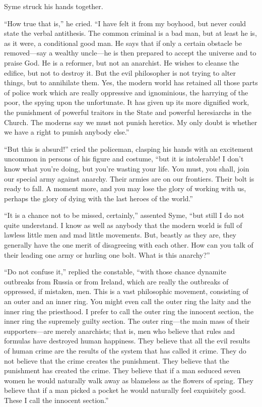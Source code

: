 Syme struck his hands together.

“How true that is,” he cried. “I have felt it from my boyhood, but never could state the verbal antithesis. The common criminal is a bad man, but at least he is, as it were, a conditional good man. He says that if only a certain obstacle be removed⁠—say a wealthy uncle⁠—he is then prepared to accept the universe and to praise God. He is a reformer, but not an anarchist. He wishes to cleanse the edifice, but not to destroy it. But the evil philosopher is not trying to alter things, but to annihilate them. Yes, the modern world has retained all those parts of police work which are really oppressive and ignominious, the harrying of the poor, the spying upon the unfortunate. It has given up its more dignified work, the punishment of powerful traitors in the State and powerful heresiarchs in the Church. The moderns say we must not punish heretics. My only doubt is whether we have a right to punish anybody else.”

“But this is absurd!” cried the policeman, clasping his hands with an excitement uncommon in persons of his figure and costume, “but it is intolerable! I don’t know what you’re doing, but you’re wasting your life. You must, you shall, join our special army against anarchy. Their armies are on our frontiers. Their bolt is ready to fall. A moment more, and you may lose the glory of working with us, perhaps the glory of dying with the last heroes of the world.”

“It is a chance not to be missed, certainly,” assented Syme, “but still I do not quite understand. I know as well as anybody that the modern world is full of lawless little men and mad little movements. But, beastly as they are, they generally have the one merit of disagreeing with each other. How can you talk of their leading one army or hurling one bolt. What is this anarchy?”

“Do not confuse it,” replied the constable, “with those chance dynamite outbreaks from Russia or from Ireland, which are really the outbreaks of oppressed, if mistaken, men. This is a vast philosophic movement, consisting of an outer and an inner ring. You might even call the outer ring the laity and the inner ring the priesthood. I prefer to call the outer ring the innocent section, the inner ring the supremely guilty section. The outer ring⁠—the main mass of their supporters⁠—are merely anarchists; that is, men who believe that rules and formulas have destroyed human happiness. They believe that all the evil results of human crime are the results of the system that has called it crime. They do not believe that the crime creates the punishment. They believe that the punishment has created the crime. They believe that if a man seduced seven women he would naturally walk away as blameless as the flowers of spring. They believe that if a man picked a pocket he would naturally feel exquisitely good. These I call the innocent section.”

